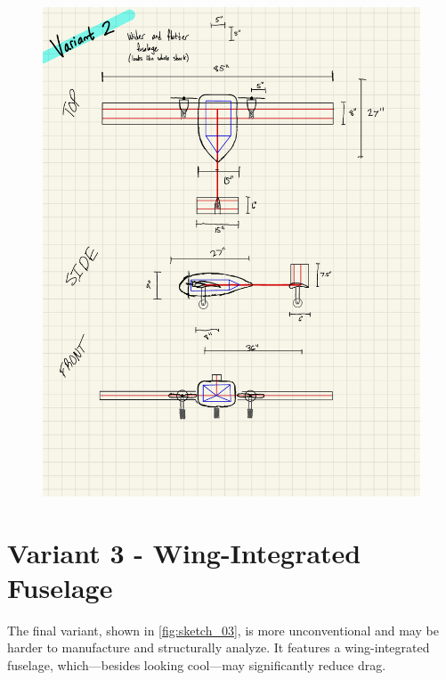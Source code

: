 \begin{figure}[htpb]
    \centering
    \includegraphics[width=0.9\linewidth]{Figures/aircraft_sketch_02.pdf}
    \caption[Concept sketch variant 2]{}
    \label{fig:sketch_02}
\end{figure}

\newpage

\section{Variant 3 - Wing-Integrated Fuselage}

The final variant, shown in \autoref{fig:sketch_03}, is more unconventional and may be harder to manufacture and structurally analyze. It features a wing-integrated fuselage, which—besides looking cool—may significantly reduce drag.

